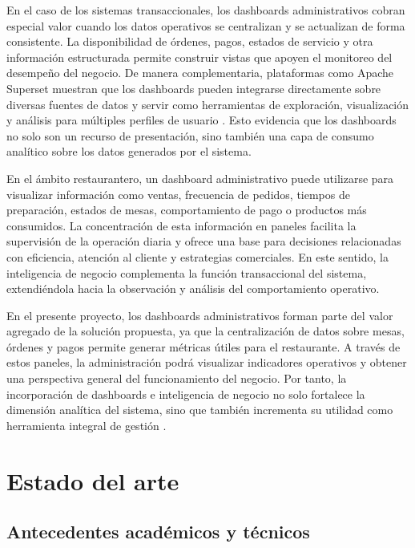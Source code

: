 \documentclass[12pt]{report}
\begin{document}
En el caso de los sistemas transaccionales, los dashboards administrativos cobran especial valor cuando los datos operativos se centralizan y se actualizan de forma consistente. La disponibilidad de órdenes, pagos, estados de servicio y otra información estructurada permite construir vistas que apoyen el monitoreo del desempeño del negocio. De manera complementaria, plataformas como Apache Superset muestran que los dashboards pueden integrarse directamente sobre diversas fuentes de datos y servir como herramientas de exploración, visualización y análisis para múltiples perfiles de usuario \cite{superset_intro_2026,superset_home_2026}. Esto evidencia que los dashboards no solo son un recurso de presentación, sino también una capa de consumo analítico sobre los datos generados por el sistema.

En el ámbito restaurantero, un dashboard administrativo puede utilizarse para visualizar información como ventas, frecuencia de pedidos, tiempos de preparación, estados de mesas, comportamiento de pago o productos más consumidos. La concentración de esta información en paneles facilita la supervisión de la operación diaria y ofrece una base para decisiones relacionadas con eficiencia, atención al cliente y estrategias comerciales. En este sentido, la inteligencia de negocio complementa la función transaccional del sistema, extendiéndola hacia la observación y análisis del comportamiento operativo.

En el presente proyecto, los dashboards administrativos forman parte del valor agregado de la solución propuesta, ya que la centralización de datos sobre mesas, órdenes y pagos permite generar métricas útiles para el restaurante. A través de estos paneles, la administración podrá visualizar indicadores operativos y obtener una perspectiva general del funcionamiento del negocio. Por tanto, la incorporación de dashboards e inteligencia de negocio no solo fortalece la dimensión analítica del sistema, sino que también incrementa su utilidad como herramienta integral de gestión \cite{ibm_bi_2025,tableau_dashboard_overview_2026,powerbi_overview_2025}.

\section{Estado del arte}
\subsection{Antecedentes académicos y técnicos}
\end{document}
